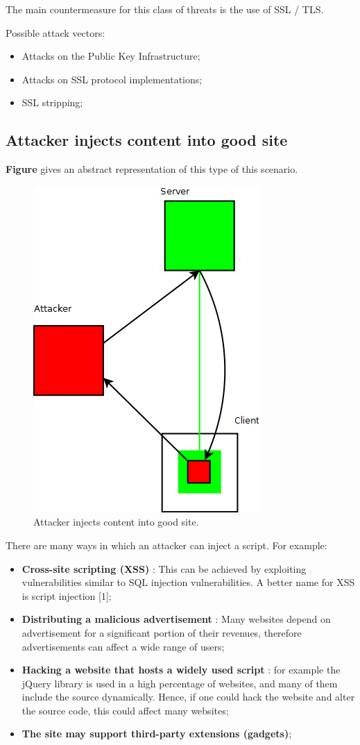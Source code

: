 The main countermeasure for this class of threats is the use of SSL / TLS.

Possible attack vectors:
\begin{itemize}
	\item Attacks on the Public Key Infrastructure;
	\item Attacks on SSL protocol implementations;
	\item SSL stripping;
\end{itemize}


\subsection{Attacker injects content into good site}

\textbf{Figure} gives an abstract representation of this type of this scenario.

\begin{figure}[H]
	\begin{center}		
		\includegraphics[width=0.3\columnwidth]{img/security/threat-scenario-bad-server-injects-content}
		\caption{Attacker injects content into good site.}
		\label{fig:threat-scenario:bad-server-injects-content}
	\end{center}
\end{figure}


There are many ways in which an attacker can inject a script. For example:
\begin{itemize}
	\item \textbf{Cross-site scripting (XSS)} : This can be achieved by exploiting vulnerabilities similar to SQL injection vulnerabilities. A better name for XSS is script injection [1];
	\item \textbf{Distributing a malicious advertisement} : Many websites depend on advertisement for a significant portion of their revenues, therefore advertisements can affect a wide range of users;
	\item \textbf{Hacking a website that hosts a widely used script} : for example the jQuery library is used in a high percentage of websites, and many of them include the source dynamically. Hence, if one could hack the website and alter the source code, this could affect many websites;
	\item \textbf{The site may support third-party extensions (gadgets)};
\end{itemize}

